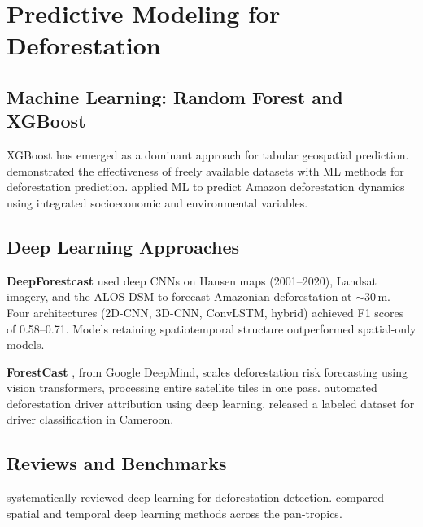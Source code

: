 \documentclass[11pt,a4paper]{article}
\begin{document}
\section{Predictive Modeling for Deforestation}

\subsection{Machine Learning: Random Forest and XGBoost}

XGBoost \citep{Chen2016} has emerged as a dominant approach for tabular geospatial prediction. \citet{Mayfield2020} demonstrated the effectiveness of freely available datasets with ML methods for deforestation prediction. \citet{Saha2024} applied ML to predict Amazon deforestation dynamics using integrated socioeconomic and environmental variables.

\subsection{Deep Learning Approaches}

\textbf{DeepForestcast} \citep{Ball2022} used deep CNNs on Hansen maps (2001--2020), Landsat imagery, and the ALOS DSM to forecast Amazonian deforestation at $\sim$30\,m. Four architectures (2D-CNN, 3D-CNN, ConvLSTM, hybrid) achieved F1 scores of 0.58--0.71. Models retaining spatiotemporal structure outperformed spatial-only models.

\textbf{ForestCast} \citep{ForestCast2025}, from Google DeepMind, scales deforestation risk forecasting using vision transformers, processing entire satellite tiles in one pass. \citet{Irvin2024} automated deforestation driver attribution using deep learning. \citet{Descals2024} released a labeled dataset for driver classification in Cameroon.

\subsection{Reviews and Benchmarks}

\citet{Mugabowindekwe2024} systematically reviewed deep learning for deforestation detection. \citet{Ortiz-Reyes2021} compared spatial and temporal deep learning methods across the pan-tropics.

\end{document}
